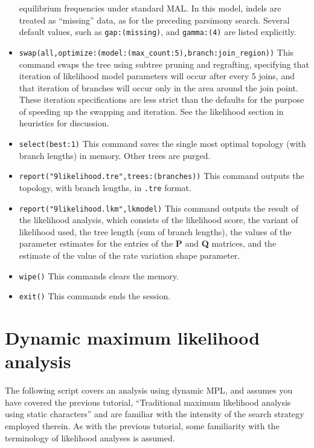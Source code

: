 \begin{itemize}
equilibrium frequencies under standard MAL. In this model, indels are treated as ``missing'' data, as for the 
preceding parsimony search. Several default values, such as \texttt{gap:(missing)}, and \texttt{gamma:(4)} are 
listed explicitly.
\item \texttt{swap(all,optimize:(model:(max\_count:5),branch:join\_region))} This command swaps the tree using 
subtree pruning and regrafting, specifying that iteration of likelihood model parameters will occur after every 5 
joins, and that iteration of branches will occur only in the area around the join point. These iteration 
specifications are less strict than the defaults for the purpose of speeding up the swapping and iteration. See the
likelihood section in heuristics for discussion. 
\item \texttt{select(best:1)} This command saves the single most optimal topology (with branch lengths) in 
memory. Other trees are purged.
\item \texttt{report("9likelihood.tre",trees:(branches))} This command outputs the topology, with branch lengths, in 
\texttt{.tre} format.
\item \texttt{report("9likelihood.lkm",lkmodel)} This command outputs the result of the likelihood analysis, which 
consists of the likelihood score, the variant of likelihood used, the tree length (sum of branch lengths), the values 
of the parameter estimates for the entries of the \textbf{P} and \textbf{Q} matrices, and the estimate of the value of 
the rate variation shape parameter.
\item \texttt{wipe()} This commands clears the memory.
\item \texttt{exit()} This commands ends the \poy session.
\end{itemize}

\section{Dynamic maximum likelihood analysis}{\label{tutorial10}}
The following script covers an analysis using dynamic MPL, and assumes you have covered the previous 
tutorial, ``Traditional maximum likelihood analysis using static characters'' and are familiar with the intensity of 
the search strategy employed therein. As with the previous tutorial, some familiarity with the terminology of 
likelihood analyses is assumed.

